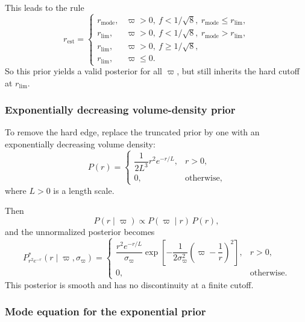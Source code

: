 \documentclass[11pt, titlepage]{article} %
\numberwithin{equation}{section}
\theoremstyle{definition}
\numberwithin{assumption}{section}
\begin{document}
This leads to the rule
\begin{equation*}
    r_{\mathrm{est}}=
    \begin{cases}
        r_{\mathrm{mode}}, & \varpi>0,\ f<1/\sqrt{8},\ r_{\mathrm{mode}}\le r_{\mathrm{lim}},\\
        r_{\mathrm{lim}}, & \varpi>0,\ f<1/\sqrt{8},\ r_{\mathrm{mode}}>r_{\mathrm{lim}},\\
        r_{\mathrm{lim}}, & \varpi>0,\ f\ge 1/\sqrt{8},\\
        r_{\mathrm{lim}}, & \varpi\le 0.
    \end{cases}
\end{equation*}
So this prior yields a valid posterior for all $\varpi$, but still inherits the hard cutoff at $r_{\mathrm{lim}}$.

\subsubsection*{Exponentially decreasing volume-density prior}

To remove the hard edge, replace the truncated prior by one with an exponentially decreasing volume density:
\begin{equation*}
    P(r)=
    \begin{cases}
        \dfrac{1}{2L^3}r^2e^{-r/L}, & r>0,\\
        0, & \text{otherwise},
    \end{cases}
\end{equation*}
where $L>0$ is a length scale.

Then
\begin{equation*}
    P(r\mid \varpi)\propto P(\varpi\mid r)\,P(r),
\end{equation*}
and the unnormalized posterior becomes
\begin{equation*}
    P_{r^2e^{-r}}^*(r\mid \varpi,\sigma_\varpi)
    =
    \begin{cases}
        \dfrac{r^2e^{-r/L}}{\sigma_\varpi}
        \exp\!\left[
        -\dfrac{1}{2\sigma_\varpi^2}
        \left(\varpi-\dfrac{1}{r}\right)^2
        \right], & r>0,\\
        0, & \text{otherwise}.
    \end{cases}
\end{equation*}
This posterior is smooth and has no discontinuity at a finite cutoff.

\subsubsection*{Mode equation for the exponential prior}
\end{document}
